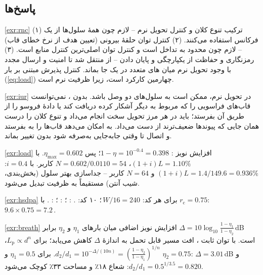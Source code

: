 \documentclass[11pt,a4paper]{article}
\begin{document}
\subsection*{پاسخ‌ها}

\begin{solutionbox}{\ref{exr:rnc}}
(۱) ترکیب تنوع کلان و کنترل تحویل نرم -- لازم چون همهٔ سلول‌ها از یک فرکانس استفاده می‌کنند.
(۲) کنترل توان حلقهٔ بیرونی (تعیین هدف  از نرخ خطای قاب) -- لازم چون  محدود به
تداخل است و کنترل توان اصلی‌ترین کنترل منابع است. (۳) رمزنگاری و حفاظت از یکپارچگی و پایان دادن
 -- از  منتقل شد تا امنیت و ارسال مجدد با وجود تحویل نرم میان
های متعدد در یک جا بماند. کنترل پذیرش مبتنی بر بار (\cref{eq:load}) چهارمین کارکرد است،
زیرا ظرفیت نرم است.
\end{solutionbox}

\begin{solutionbox}{\ref{exr:iur}}
در تحویل نرم،  ممکن است به سلول‌های دو  وصل باشد. بدون ، 
نمی‌توانست قاب‌های فراسویی را که  مربوط به  دیگر آشکار کرده دریافت کند یا دادهٔ
فروسو را از طریق آن بفرستد؛  باید در هر مرز  تحویل سخت انجام می‌داد و تنوع کلان را
درست همان جایی که پیوندها ضعیف‌ترند از دست می‌داد.  به  امکان می‌دهد قاب‌ها را
به  بفرستد و اتصال  تا وقتی جابه‌جایی به‌صرفه شود بدون تغییر بماند.
\end{solutionbox}

\begin{solutionbox}{\ref{exr:load}}
افزایش نویز : $1-\eta = 10^{-0.4} = 0.398$؛ پس $\eta_{\max} = 0.602$. با
$(1+i)L = 1.10\%$، $N = 0.602/0.0110 = 54$ کاربر. با $i = 0.4$: $(1+i)L = 1.4/149.6 = 0.936\%$ و
$N = 64$ کاربر -- جداسازی بهتر سلول (بخش‌بندی، شیب آنتن) مستقیماً به ظرفیت تبدیل می‌شود.
\end{solutionbox}

\begin{solutionbox}{\ref{exr:hsdpa}}
برای هر کد: $W/16 = 240$\,؛ ۱۰ کد: . : ؛
: ؛ : .  با $r_\mathrm{c} = 0.75$:
$9.6\times0.75 = 7.2$\,.
\end{solutionbox}

\begin{solutionbox}{\ref{exr:breath}}
افزایش نویز اضافی میان بارهای $\eta_1$ و $\eta_2$ برابر
$\Delta = 10\log_{10}\frac{1-\eta_1}{1-\eta_2}$\,dB است. با توان ثابت ، افت مسیر قابل
تحمل به اندازهٔ $\Delta$ کاهش می‌یابد؛ برای $L_\mathrm{p}\propto d^{n}$،
$d_2/d_1 = 10^{-\Delta/(10n)} = \left(\frac{1-\eta_2}{1-\eta_1}\right)^{1/n}$. برای $\eta_1=0.5$ و
$\eta_2=0.75$: $\Delta = 3.01$\,dB و $d_2/d_1 = 0.5^{1/3.5} = 0.820$: شعاع ۱۸٪ و مساحت ۳۳٪ کوچک می‌شود.
\end{solutionbox}
\end{document}
